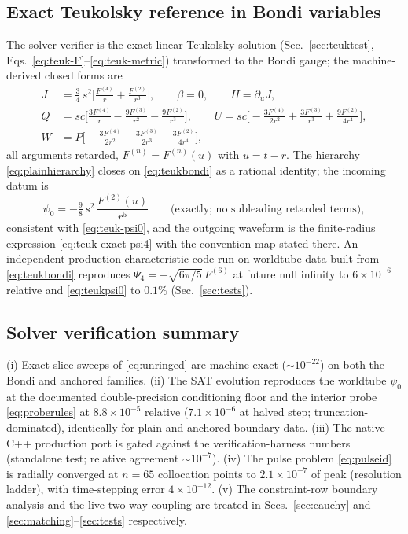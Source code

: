 \subsection{Exact Teukolsky reference in Bondi variables}
\label{sec:teukbondi}

\begin{nfblock}
The solver verifier is the exact linear Teukolsky solution
(Sec.~\ref{sec:teuktest}, Eqs.~\eqref{eq:teuk-F}--\eqref{eq:teuk-metric})
transformed to the Bondi gauge; the machine-derived closed forms are
\begin{align}
J &= \tfrac34\,s^2\Big[\frac{F^{(4)}}{r} + \frac{F^{(2)}}{r^3}\Big],
\qquad
\beta = 0,
\qquad
H = \partial_u J,
\nonumber\\
Q &= sc\Big[\frac{3F^{(4)}}{r} - \frac{9F^{(3)}}{r^2}
 - \frac{9F^{(2)}}{r^3}\Big],
\qquad
U = sc\Big[-\frac{3F^{(4)}}{2r^2} + \frac{3F^{(3)}}{r^3}
 + \frac{9F^{(2)}}{4r^4}\Big],
\nonumber\\
W &= P\Big[-\frac{3F^{(4)}}{2r^2} - \frac{3F^{(3)}}{2r^3}
 - \frac{3F^{(2)}}{4r^4}\Big],
\label{eq:teukbondi}
\end{align}
all arguments retarded, $F^{(n)} = F^{(n)}(u)$ with $u = t - r$. The
hierarchy \eqref{eq:plainhierarchy} closes on \eqref{eq:teukbondi} as a
rational identity; the incoming datum is
\begin{equation}
\psi_0 = -\tfrac98\,s^2\,\frac{F^{(2)}(u)}{r^5}
\qquad\text{(exactly; no subleading retarded terms)},
\label{eq:teukpsi0}
\end{equation}
consistent with \eqref{eq:teuk-psi0}, and the outgoing waveform is the
finite-radius expression \eqref{eq:teuk-exact-psi4} with the convention
map stated there. An independent production characteristic code run on
worldtube data built from \eqref{eq:teukbondi} reproduces
$\Psi_4 = -\sqrt{6\pi/5}\,F^{(6)}$ at future null infinity to
$6\times10^{-6}$ relative and \eqref{eq:teukpsi0} to $0.1\%$
(Sec.~\ref{sec:tests}).
\end{nfblock}

\begin{nfblock}
\subsection{Solver verification summary}
\label{sec:liveccm}

(i) Exact-slice sweeps of \eqref{eq:unringed} are machine-exact
($\sim\!10^{-22}$) on both the Bondi and anchored families. (ii) The
SAT evolution reproduces the worldtube $\psi_0$ at the documented
double-precision conditioning floor and the interior probe
\eqref{eq:proberules} at $8.8\times10^{-5}$ relative
($7.1\times10^{-6}$ at halved step; truncation-dominated), identically
for plain and anchored boundary data. (iii) The native C++ production
port is gated against the verification-harness numbers (standalone
test; relative agreement $\sim\!10^{-7}$). (iv) The pulse problem
\eqref{eq:pulseid} is radially converged at $n=65$ collocation points
to $2.1\times10^{-7}$ of peak (resolution ladder), with time-stepping
error $4\times10^{-12}$. (v) The constraint-row boundary analysis and
the live two-way coupling are treated in Secs.~\ref{sec:cauchy} and
\ref{sec:matching}--\ref{sec:tests} respectively.
\end{nfblock}
